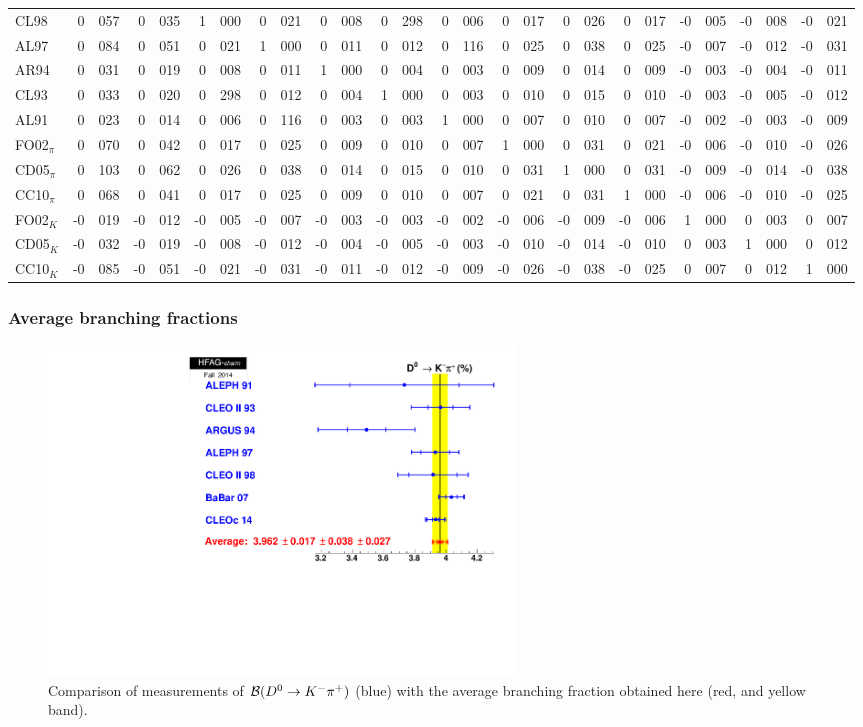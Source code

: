 \begin{table}
\begin{tabular}{lr@{.}lr@{.}lr@{.}lr@{.}lr@{.}lr@{.}lr@{.}lr@{.}lr@{.}lr@{.}lr@{.}lr@{.}lr@{.}l}
CL98 & 0&057 & 0&035 & 1&000 & 0&021 & 0&008 & 0&298 & 0&006 & 0&017 & 0&026 & 0&017 &-0&005 &-0&008 &-0&021 \\
AL97 & 0&084 & 0&051 & 0&021 & 1&000 & 0&011 & 0&012 & 0&116 & 0&025 & 0&038 & 0&025 &-0&007 &-0&012 &-0&031 \\
AR94 & 0&031 & 0&019 & 0&008 & 0&011 & 1&000 & 0&004 & 0&003 & 0&009 & 0&014 & 0&009 &-0&003 &-0&004 &-0&011 \\
CL93 & 0&033 & 0&020 & 0&298 & 0&012 & 0&004 & 1&000 & 0&003 & 0&010 & 0&015 & 0&010 &-0&003 &-0&005 &-0&012 \\
AL91 & 0&023 & 0&014 & 0&006 & 0&116 & 0&003 & 0&003 & 1&000 & 0&007 & 0&010 & 0&007 &-0&002 &-0&003 &-0&009 \\
FO02$_\pi$ & 0&070 & 0&042 & 0&017 & 0&025 & 0&009 & 0&010 & 0&007 & 1&000 & 0&031 & 0&021 &-0&006 &-0&010 &-0&026 \\
CD05$_\pi$ & 0&103 & 0&062 & 0&026 & 0&038 & 0&014 & 0&015 & 0&010 & 0&031 & 1&000 & 0&031 &-0&009 &-0&014 &-0&038 \\
CC10$_\pi$ & 0&068 & 0&041 & 0&017 & 0&025 & 0&009 & 0&010 & 0&007 & 0&021 & 0&031 & 1&000 &-0&006 &-0&010 &-0&025 \\
FO02$_K$ &-0&019 &-0&012 &-0&005 &-0&007 &-0&003 &-0&003 &-0&002 &-0&006 &-0&009 &-0&006 & 1&000 & 0&003 & 0&007 \\
CD05$_K$ &-0&032 &-0&019 &-0&008 &-0&012 &-0&004 &-0&005 &-0&003 &-0&010 &-0&014 &-0&010 & 0&003 & 1&000 & 0&012 \\
CC10$_K$ &-0&085 &-0&051 &-0&021 &-0&031 &-0&011 &-0&012 &-0&009 &-0&026 &-0&038 &-0&025 & 0&007 & 0&012 & 1&000 \\
\hline
\end{tabular}
\end{table}


\subsubsection{Average branching fractions}
\begin{figure}
\begin{center}
\includegraphics[width=0.6\textwidth,angle=0.]{figures/charm/D0Kpi_2014.pdf}
\caption{Comparison of measurements of 
${\cal B}(D^0\to K^-\pi^+)$ (blue) with the average 
branching fraction obtained here (red, and yellow band).}
\label{D0bfs}
\end{center}
\end{figure}

